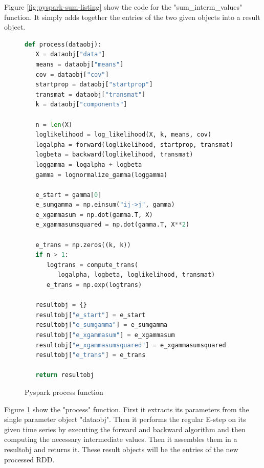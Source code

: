 Figure \ref{fig:pyspark-sum-listing} show the code for the "sum\_interm\_values" function. It simply adds together the entries of the two given objects into a result object. 

\begin{figure}
\begin{singlespace}
\begin{lstlisting}[language=Python]
def process(dataobj):
   X = dataobj["data"]
   means = dataobj["means"]
   cov = dataobj["cov"]
   startprop = dataobj["startprop"]
   transmat = dataobj["transmat"]
   k = dataobj["components"]

   n = len(X)
   loglikelihood = log_likelihood(X, k, means, cov)
   logalpha = forward(loglikelihood, startprop, transmat)
   logbeta = backward(loglikelihood, transmat)
   loggamma = logalpha + logbeta
   gamma = lognormalize_gamma(loggamma)

   e_start = gamma[0]
   e_sumgamma = np.einsum("ij->j", gamma)
   e_xgammasum = np.dot(gamma.T, X)
   e_xgammasumsquared = np.dot(gamma.T, X**2)

   e_trans = np.zeros((k, k))
   if n > 1:
      logtrans = compute_trans(
         logalpha, logbeta, loglikelihood, transmat)
      e_trans = np.exp(logtrans)

   resultobj = {}
   resultobj["e_start"] = e_start
   resultobj["e_sumgamma"] = e_sumgamma
   resultobj["e_xgammasum"] = e_xgammasum
   resultobj["e_xgammasumsquared"] = e_xgammasumsquared
   resultobj["e_trans"] = e_trans

   return resultobj
\end{lstlisting}
\end{singlespace}
\caption{Pyspark process function}    
\label{fig:pyspark-process-listing}
\end{figure}

Figure \ref{fig:pyspark-process-listing} show the "process" function. First it extracts its parameters from the single parameter object "dataobj". Then it performs the regular E-step on its given time series by executing the forward and backward algorithm and then computing the necessary intermediate values. Then it assembles them in a resultobj and returns it. These result objects will be the entries of the new processed RDD.